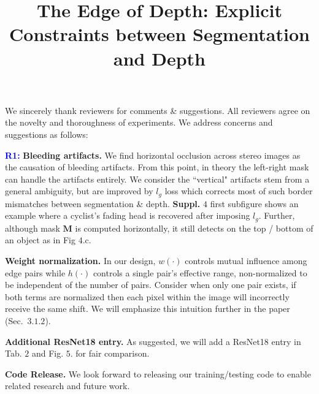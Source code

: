 \documentclass[10pt,twocolumn,letterpaper]{article}
\newcommand{\Paragraph}[1]{\vspace{0.40mm} \noindent \textbf{#1} \hspace{0mm}}
\begin{document}
\title{The Edge of Depth: Explicit Constraints between Segmentation and Depth}  %

\maketitle
\thispagestyle{empty}


\noindent We sincerely thank reviewers for comments \& suggestions.
All reviewers agree on the novelty and thoroughness of experiments. 
We address concerns and suggestions as follows:

\Paragraph{\textcolor{blue}{R1:}}
\textbf{Bleeding artifacts.} 
We find horizontal occlusion across stereo images as the causation of bleeding artifacts. 
From this point, in theory the left-right mask can handle the artifacts entirely.
We consider the ``vertical" artifacts stem from a general ambiguity, but are improved by $l_g$ loss which corrects most of such border mismatches between segmentation \& depth. 
\textbf{Suppl.} $4$ first subfigure shows an example where a cyclist's fading head is recovered after imposing $l_g$. 
Further, although mask $\mathbf{M}$ is computed horizontally, it still detects on the top / bottom of an object as in Fig $4$.c.

\Paragraph{Weight normalization.} 
In our design, $w(\cdot)$ controls mutual influence among edge pairs while $h(\cdot)$ controls a single pair's effective range, non-normalized to be independent of the number of pairs. 
Consider when only one pair exists, if both terms are normalized then each pixel within the image will incorrectly receive the same shift.
We will emphasize this intuition further in the paper (Sec.~$3.1.2$). 

\Paragraph{Additional ResNet18 entry.} 
As suggested, we will add a ResNet18 entry in Tab. $2$ and Fig. $5$. for fair comparison.

\Paragraph{Code Release.} 
We look forward to releasing our training/testing code to enable related research and future work. 
\end{document}
